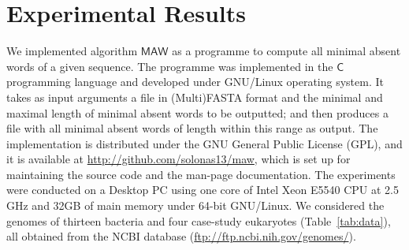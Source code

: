 \documentclass{llncs}
\begin{document}
\section{Experimental Results}
\label{sec:exp}
  We implemented algorithm $\textsf{MAW}$ as a programme to compute all minimal absent words of a given sequence. 
  The programme was implemented in the $\textsf{C}$ programming language and developed under GNU/Linux operating system. 
  It takes as input arguments a file in (Multi)FASTA format and the minimal and maximal length of minimal absent words to be outputted; and then 
  produces a file with all minimal absent words of length within this range as output.
  The implementation is distributed under the GNU General Public License (GPL), and it is available at \url{http://github.com/solonas13/maw}, which is set up for maintaining the source code and the man-page documentation.
  The experiments were conducted on a Desktop PC using one core of Intel Xeon E5540 CPU at 2.5 GHz and 32GB of main memory under 64-bit GNU/Linux.
  We considered the genomes of thirteen bacteria and four case-study eukaryotes (Table~\ref{tab:data}), all obtained from the NCBI database (\url{ftp://ftp.ncbi.nih.gov/genomes/}).
\end{document}
